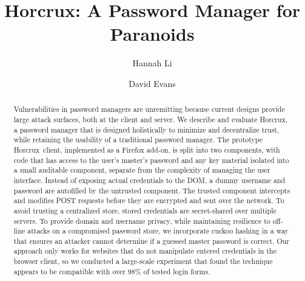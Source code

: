 \documentclass[sigconf, anonymous]{acmart}
\newcommand*\SecPass{Horcrux}
\begin{document}
\title{Horcrux: A Password Manager for Paranoids}

\author{Hannah Li}

\author{David Evans}

\begin{abstract}
Vulnerabilities in password managers are unremitting because current designs provide large attack surfaces, both at the client and server. We describe and evaluate \SecPass, a password manager that is designed holistically to minimize and decentralize trust, while retaining the usability of a traditional password manager. The prototype \SecPass\ client, implemented as a Firefox add-on, is split into two components, with code that has access to the user's master's password and any key material isolated into a small auditable component, separate from the complexity of managing the user interface. Instead of exposing actual credentials to the DOM, a dummy username and password are autofilled by the untrusted component. The trusted component intercepts and modifies POST requests before they are encrypted and sent over the network. To avoid trusting a centralized store, stored credentials are secret-shared over multiple servers. To provide domain and username privacy, while maintaining resilience to off-line attacks on a compromised password store, we incorporate cuckoo hashing in a way that ensures an attacker cannot determine if a guessed master password is correct. Our approach only works for websites that do not manipulate entered credentials in the browser client, so we conducted a large-scale experiment that found the technique appears to be compatible with over 98\% of tested login forms.
\end{abstract}

%
%
\end{document}
